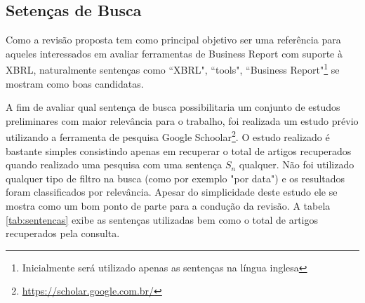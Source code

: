 \documentclass{article}
\begin{document}
\subsection{Setenças de Busca}
\label{subsec:setences}

Como a revisão proposta tem como principal objetivo ser uma referência para aqueles interessados em avaliar ferramentas de Business Report com suporte à XBRL, naturalmente sentenças como ``XBRL", ``tools", ``Business Report"\footnote{Inicialmente será utilizado apenas as sentenças na língua inglesa} se mostram como boas candidatas. 

A fim de avaliar qual sentença de busca possibilitaria um conjunto de estudos preliminares com maior relevância para o trabalho, foi realizada um estudo prévio utilizando a ferramenta de pesquisa Google Schoolar\footnote{\url{https://scholar.google.com.br/}}. O estudo realizado é bastante simples consistindo apenas em recuperar o total de artigos recuperados quando realizado uma pesquisa com uma sentença $S_n$ qualquer. Não foi utilizado qualquer tipo de filtro na busca (como por exemplo "por data") e os resultados foram classificados por relevância. Apesar do simplicidade deste estudo ele se mostra como um bom ponto de parte para a condução da revisão. A tabela \ref{tab:sentencas} exibe as sentenças utilizadas bem como o total de artigos recuperados pela consulta. 


\begin{table}[]
\centering
{}
\caption{Total de artigos por sentença}
\label{tab:sentencas}
\end{table}
\end{document}
